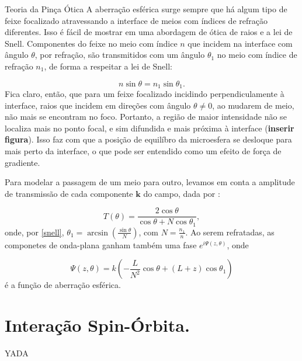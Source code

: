 \begin{chapter}{Teoria da Pinça Ótica}
\hspace{5 mm}A aberração esférica surge sempre que há algum tipo de feixe focalizado atravessando a interface de meios com índices de refração diferentes. Isso é fácil de mostrar em uma abordagem de ótica de raios e a lei de Snell. Componentes do feixe no meio com índice $n$ que incidem na interface com ângulo $\theta$, por refração, são transmitidos com um ângulo $\theta_1$ no meio com índice de refração $n_1$, de forma a respeitar a lei de Snell:

\begin{equation}
n\sin\theta=n_1\sin\theta_1.
\label{snell}
\end{equation}
%
Fica claro, então, que para um feixe focalizado incidindo perpendiculamente à interface, raios que incidem em direções com ângulo $\theta\ne 0$, ao mudarem de meio, não mais se encontram no foco. Portanto, a região de maior intensidade não se localiza mais no ponto focal, e sim difundida e mais próxima à interface ({\bf inserir figura}). Isso faz com que a posição de equilíbro da microesfera se desloque para mais perto da interface, o que pode ser entendido como um efeito de força de gradiente.

Para modelar a passagem de um meio para outro, levamos em conta a amplitude de transmissão de cada componente ${\mathbf k}$ do campo, dada por \cite{Viana2007}:

\begin{equation}
T(\theta)=\frac{2\cos\theta}{\cos\theta + N\cos\theta_1} ,
\label{transmitancia}
\end{equation}
%
onde, por \ref{snell}, $\theta_1=\arcsin(\frac{\sin\theta}{N})$, com $N=\frac{n_1}{n}$. Ao serem refratadas, as componetes de onda-plana ganham também uma fase $e^{i\Psi(z, \theta)}$, onde

\begin{equation}
\Psi(z,\theta)=k\left( -\frac{L}{N^2}\cos\theta +(L+z)\cos\theta_1 \right) 
\label{faseSA}
\end{equation}
%
é a função de aberração esférica.


\section{Interação Spin-Órbita.}

YADA

\end{chapter}